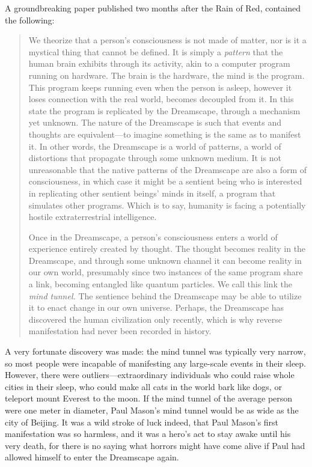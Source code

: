 \documentclass[openany, oneside]{book}
\begin{document}
A groundbreaking paper published two months after the Rain of Red, contained the following:

\begin{quote}
  We theorize that a person's consciousness is not made of matter, nor is it a mystical thing that cannot be defined.
  It is simply a \emph{pattern} that the human brain exhibits through its activity, akin to a computer program running on hardware.
  The brain is the hardware, the mind is the program.
  This program keeps running even when the person is asleep, however it loses connection with the real world, becomes decoupled from it.
  In this state the program is replicated by the Dreamscape, through a mechanism yet unknown.
  The nature of the Dreamscape is such that events and thoughts are equivalent---to imagine something is the same as to manifest it.
  In other words, the Dreamscape is a world of patterns, a world of distortions that propagate through some unknown medium.
  It is not unreasonable that the native patterns of the Dreamscape are also a form of consciousness, in which case it might be a sentient being who is interested in replicating other sentient beings' minds in itself, a program that simulates other programs.
  Which is to say, humanity is facing a potentially hostile extraterrestrial intelligence.

  Once in the Dreamscape, a person's consciousness enters a world of experience entirely created by thought.
  The thought becomes reality in the Dreamscape, and through some unknown channel it can become reality in our own world, presumably since two instances of the same program share a link, becoming entangled like quantum particles.
  We call this link the \emph{mind tunnel.}
  The sentience behind the Dreamscape may be able to utilize it to enact change in our own universe.
  Perhaps, the Dreamscape has discovered the human civilization only recently, which is why reverse manifestation had never been recorded in history.
\end{quote}

A very fortunate discovery was made: the mind tunnel was typically very narrow, so most people were incapable of manifesting any large-scale events in their sleep.
However, there were outliers---extraordinary individuals who could raise whole cities in their sleep, who could make all cats in the world bark like dogs, or teleport mount Everest to the moon.
If the mind tunnel of the average person were one meter in diameter, Paul Mason's mind tunnel would be as wide as the city of Beijing.
It was a wild stroke of luck indeed, that Paul Mason's first manifestation was so harmless, and it was a hero's act to stay awake until his very death, for there is no saying what horrors might have come alive if Paul had allowed himself to enter the Dreamscape again.\\
\end{document}
